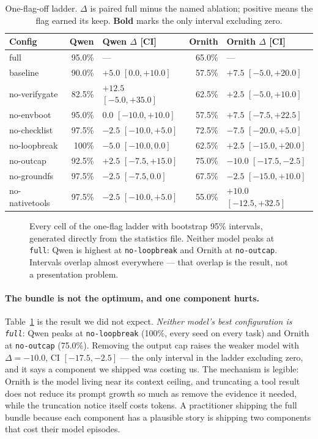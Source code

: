 \documentclass[10pt]{article}
\begin{document}
\begin{table}[t]
\centering
\small
\caption{One-flag-off ladder. $\Delta$ is paired full minus the named ablation; positive means
the flag earned its keep. \textbf{Bold} marks the only interval excluding zero.}
\label{tab:ladder}
\begin{tabular}{lrlrl}
\toprule
Config & Qwen & Qwen $\Delta$ [CI] & Ornith & Ornith $\Delta$ [CI] \\
\midrule
full            & 95.0\% & ---                    & 65.0\% & --- \\
baseline        & 90.0\% & $+5.0$ $[0.0, +10.0]$  & 57.5\% & $+7.5$ $[-5.0, +20.0]$ \\
no-verifygate   & 82.5\% & $+12.5$ $[-5.0, +35.0]$& 62.5\% & $+2.5$ $[-5.0, +10.0]$ \\
no-envboot      & 95.0\% & $0.0$ $[-10.0, +10.0]$ & 57.5\% & $+7.5$ $[-7.5, +22.5]$ \\
no-checklist    & 97.5\% & $-2.5$ $[-10.0, +5.0]$ & 72.5\% & $-7.5$ $[-20.0, +5.0]$ \\
no-loopbreak    & 100\%  & $-5.0$ $[-10.0, 0.0]$  & 62.5\% & $+2.5$ $[-15.0, +20.0]$ \\
no-outcap       & 92.5\% & $+2.5$ $[-7.5, +15.0]$ & 75.0\% & $\mathbf{-10.0}$ $\mathbf{[-17.5, -2.5]}$ \\
no-groundfs     & 97.5\% & $-2.5$ $[-7.5, 0.0]$   & 67.5\% & $-2.5$ $[-15.0, +10.0]$ \\
no-nativetools  & 97.5\% & $-2.5$ $[-10.0, +5.0]$ & 55.0\% & $+10.0$ $[-12.5, +32.5]$ \\
\bottomrule
\end{tabular}
\end{table}

\begin{figure}[t]
\centering

\caption{Every cell of the one-flag ladder with bootstrap 95\% intervals, generated directly
from the statistics file. Neither model peaks at \texttt{full}: Qwen is highest at
\texttt{no-loopbreak} and Ornith at \texttt{no-outcap}. Intervals overlap almost everywhere ---
that overlap is the result, not a presentation problem.}
\label{fig:ladder}
\end{figure}

\paragraph{The bundle is not the optimum, and one component hurts.}
Table~\ref{tab:ladder} is the result we did not expect. \emph{Neither model's best
configuration is \texttt{full}}: Qwen peaks at \texttt{no-loopbreak} (100\%, every seed on every
task) and Ornith at \texttt{no-outcap} (75.0\%). Removing the output cap raises the weaker
model with $\Delta = -10.0$, CI $[-17.5, -2.5]$ --- the only interval in the ladder excluding
zero, and it says a component we shipped was costing us. The mechanism is legible: Ornith is
the model living near its context ceiling, and truncating a tool result does not reduce its
prompt growth so much as remove the evidence it needed, while the truncation notice itself
costs tokens. A practitioner shipping the full bundle because each component has a plausible
story is shipping two components that cost their model episodes.
\end{document}
